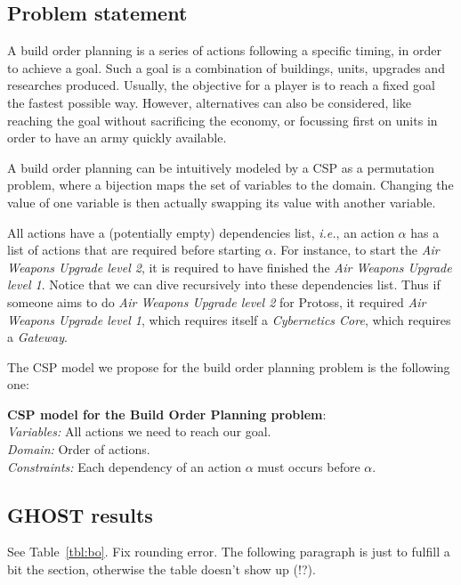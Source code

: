 \documentclass[journal]{IEEEtran}
\newcommand{\csp}{\textsc{CSP}\xspace}
\newcommand{\ghost}{\textsc{GHOST}\xspace}
\newcommand{\ie}{\textit{i.e.}}
\newcommand{\modelcsp}[4]%
{ \begin{trivlist}
  \item[]%
    \textbf{CSP model for #1}:\\
    \textit{Variables:} #2\\
    \textit{Domain:} #3\\
    \textit{Constraints:} #4
  \end{trivlist}%
}
\begin{document}
\subsection{Problem statement}
A build  order planning is  a series  of actions following  a specific
timing, in order  to achieve a goal.  Such a goal is  a combination of
buildings,  units,  upgrades  and researches  produced.  Usually,  the
objective for a  player is to reach a fixed  goal the fastest possible
way. However, alternatives  can also be considered,  like reaching the
goal without sacrificing  the economy, or focussing first  on units in
order to have an army quickly available.

A  build order  planning can  be intuitively  modeled by  a \csp  as a
permutation problem,  where a bijection  maps the set of  variables to
the  domain. Changing  the  value  of one  variable  is then  actually
swapping its value with another variable.

All  actions have  a (potentially  empty) dependencies  list, \ie,  an
action  $\alpha$  has a  list  of  actions  that are  required  before
starting  $\alpha$.  For  instance, to  start the  \textit{Air Weapons
  Upgrade level  2}, it is  required to have finished  the \textit{Air
  Weapons Upgrade level  1}. Notice that we can  dive recursively into
these  dependencies  list. Thus  if  someone  aims to  do  \textit{Air
  Weapons  Upgrade  level  2}  for Protoss,  it  required  \textit{Air
  Weapons    Upgrade   level    1},    which    requires   itself    a
\textit{Cybernetics Core}, which requires a \textit{Gateway}.

The \csp model we propose for  the build order planning problem is the
following one:

\modelcsp{the Build Order Planning problem}%
{All actions we need to reach our goal.}%
{Order of actions.}%
{Each dependency of an action $\alpha$ must occurs before $\alpha$.}

\subsection{\ghost results}

See Table~\ref{tbl:bo}. Fix rounding error. The following paragraph is
just to fulfill a bit the section, otherwise the table doesn't show up
(!?).
\end{document}
